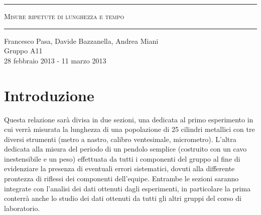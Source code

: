 \begin{titlepage}
\begin{center}
	\hrule \vspace{0.5cm}
     	\textsc{\LARGE Misure ripetute di lunghezza e tempo}
	\vspace{0.5cm} \hrule \vspace{2cm}
      	{\large Francesco Pasa, Davide Bazzanella, Andrea Miani\\
		Gruppo A11}\\
	\vspace{0.5cm}
      	{\large 28 febbraio 2013 - 11 marzo 2013}
	\vfill
	{\begin{abstract}
Misura della lunghezza di un gruppo di 25 cilindri di metallo e della durata del periodo di oscillazione di un pendolo semplice.
Analisi dei valori ottenuti dagli esperimenti del singolo gruppo e dei valori raccolti dagli esperimenti di tutti i gruppi di laboratorio.
	 \end{abstract}}
\end{center}
\end{titlepage}

\newpage

\vspace*{\fill}
\begin{center}
	\tableofcontents
\end{center}
\vspace*{\fill}

\newpage

\section{Introduzione}
Questa relazione sarà divisa in due sezioni, una dedicata al primo esperimento
in cui verrà misurata la lunghezza di una popolazione di 25 cilindri metallici
con tre diversi strumenti (metro a nastro, calibro ventesimale, micrometro).
L'altra dedicata alla misura del periodo di un pendolo semplice (costruito con
un cavo inestensibile e un peso) effettuata da tutti i componenti del gruppo
al fine di evidenziare la presenza di eventuali errori sistematici, dovuti
alla differente prontezza di riflessi dei componenti dell'equipe. Entrambe
le sezioni saranno integrate con l'analisi dei dati ottenuti dagli
esperimenti, in particolare la prima conterrà anche lo studio dei dati
ottenuti da tutti gli altri gruppi del corso di laboratorio.

